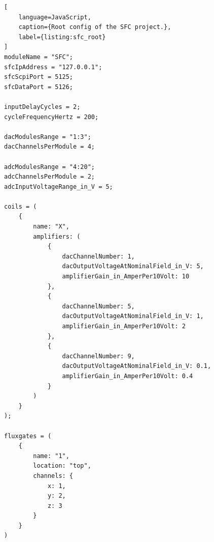 \begin{lstlisting}[
	language=JavaScript,
	caption={Root config of the SFC project.},
	label={listing:sfc_root}
]
moduleName = "SFC";
sfcIpAddress = "127.0.0.1";
sfcScpiPort = 5125;
sfcDataPort = 5126;

inputDelayCycles = 2;
cycleFrequencyHertz = 200;

dacModulesRange = "1:3";
dacChannelsPerModule = 4;

adcModulesRange = "4:20";
adcChannelsPerModule = 2;
adcInputVoltageRange_in_V = 5;

coils = (
    {
        name: "X",
        amplifiers: (
            {
                dacChannelNumber: 1,
                dacOutputVoltageAtNominalField_in_V: 5,
                amplifierGain_in_AmperPer10Volt: 10
            },
            {
                dacChannelNumber: 5,
                dacOutputVoltageAtNominalField_in_V: 1,
                amplifierGain_in_AmperPer10Volt: 2
            },
            {
                dacChannelNumber: 9,
                dacOutputVoltageAtNominalField_in_V: 0.1,
                amplifierGain_in_AmperPer10Volt: 0.4
            }
        )
    }
);

fluxgates = (
    {
        name: "1",
        location: "top",
        channels: {
            x: 1,
            y: 2,
            z: 3
        }
    }
)
\end{lstlisting}

